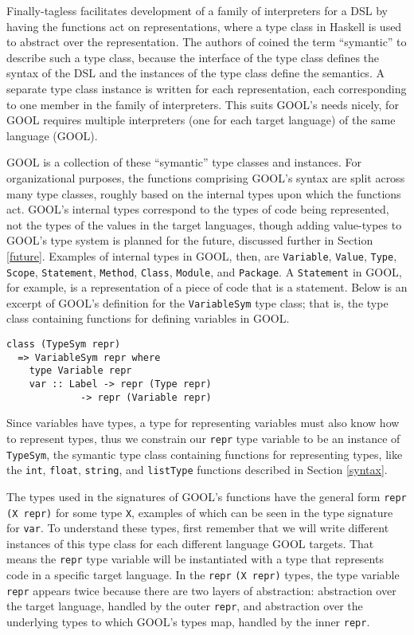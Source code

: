 \documentclass[sigplan,review,anonymous]{acmart}
\begin{document}
Finally-tagless facilitates development of a family of interpreters for a DSL 
by having the functions act on representations, where a type class in Haskell 
is used to abstract over the representation. The authors of 
\cite{carette2009finally} coined the term ``symantic'' to describe such a type 
class, because the interface of the type class defines the syntax of the DSL 
and the instances of the type class define the semantics. A separate type class 
instance is written for each representation, each corresponding to one member 
in the family of interpreters. This suits GOOL's needs nicely, for GOOL 
requires multiple interpreters (one for each target language) of the same 
language (GOOL).

GOOL is a collection of these ``symantic'' type classes and instances. For 
organizational purposes, the functions comprising GOOL's syntax are split 
across many type classes, roughly based on the internal types upon which the 
functions act. GOOL's internal types correspond to the types of code being 
represented, not the types of the values in the target languages, though adding 
value-types to GOOL's type system is planned for the future, discussed further 
in Section \ref{future}. Examples of internal types in GOOL, then, are 
\verb|Variable|, \verb|Value|, \verb|Type|, \verb|Scope|, \verb|Statement|, 
\verb|Method|, \verb|Class|, \verb|Module|, and \verb|Package|. A 
\verb|Statement| in GOOL, for example, is a representation of a piece of code 
that is a statement. Below is an excerpt of GOOL's definition for the 
\verb|VariableSym| type class; that is, the type class containing functions for 
defining variables in GOOL.
\begin{lstlisting}
class (TypeSym repr) 
  => VariableSym repr where
    type Variable repr
    var :: Label -> repr (Type repr) 
             -> repr (Variable repr)
\end{lstlisting}
Since variables have types, a type for representing variables must also know 
how to represent types, thus we constrain our \verb|repr| type variable to be 
an instance of \verb|TypeSym|, the symantic type class containing functions for 
representing types, like the \verb|int|, \verb|float|, \verb|string|, and 
\verb|listType| functions described in Section \ref{syntax}. 

The types used in the signatures of GOOL's functions have the general form 
\verb|repr| \verb|(X repr)| for some type \verb|X|, examples of which can be 
seen in the type signature for \verb|var|. To understand these types, first 
remember that we will write different instances of this type class for each 
different language GOOL targets. That means the \verb|repr| type variable will 
be instantiated with a type that represents code in a specific target language. 
In the \verb|repr| \verb|(X repr)| types, the type variable \verb|repr| appears 
twice because there are two layers of abstraction: abstraction over the target 
language, handled by the outer \verb|repr|, and abstraction over the underlying 
types to which GOOL's types map, handled by the inner \verb|repr|.
\end{document}
